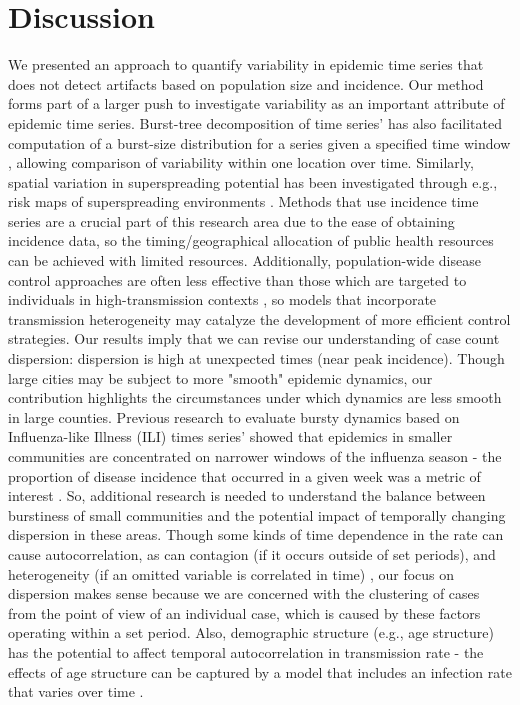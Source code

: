 \documentclass[10pt,letterpaper]{article}
\begin{document}
\section*{Discussion}
We presented an approach to quantify variability in epidemic time series that does not detect artifacts based on population size and incidence. 
Our method forms part of a larger push to investigate variability as an important attribute of epidemic time series.
Burst-tree decomposition of time series’ has also facilitated computation of a burst-size distribution for a series given a specified time window \cite{jo_burst-tree_2020}, allowing comparison of variability within one location over time. 
Similarly, spatial variation in superspreading potential has been investigated through e.g., risk maps of superspreading environments \cite{loo_identification_2021}.
Methods that use incidence time series are a crucial part of this research area due to the ease of obtaining incidence data, so the timing/geographical allocation of public health resources can be achieved with limited resources. 
Additionally, population-wide disease control approaches are often less effective than those which are targeted to individuals in high-transmission contexts \cite{lloyd-smith_superspreading_2005}, so models that incorporate transmission heterogeneity may catalyze the development of more efficient control strategies.
Our results imply that we can revise our understanding of case count dispersion: dispersion is high at unexpected times (near peak incidence).
Though large cities may be subject to more "smooth" epidemic dynamics, our contribution highlights the circumstances under which dynamics are less smooth in large counties. 
Previous research to evaluate bursty dynamics based on Influenza-like Illness (ILI) times series’ showed that epidemics in smaller communities are concentrated on narrower windows of the influenza season - the proportion of disease incidence that occurred in a given week was a metric of interest \cite{dalziel_urbanization_2018}. 
So, additional research is needed to understand the balance between burstiness of small communities and the potential impact of temporally changing dispersion in these areas.
Though some kinds of time dependence in the rate can cause autocorrelation, as can contagion (if it occurs outside of set periods), and heterogeneity (if an omitted variable is correlated in time) \cite{barron_analysis_1992}, our focus on dispersion makes sense because we are concerned with the clustering of cases from the point of view of an individual case, which is caused by these factors operating within a set period. Also, demographic structure (e.g., age structure) has the potential to affect temporal autocorrelation in transmission rate - the effects of age structure can be captured by a model that includes an infection rate that varies over time \cite{earn_dynamic_nodate}. 
\end{document}
